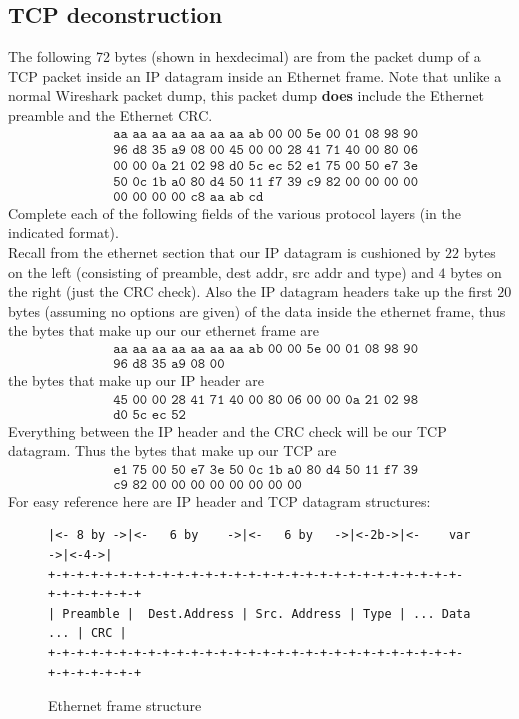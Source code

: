 \documentclass{article}
\begin{document}
\subsection*{TCP deconstruction}
The following 72 bytes (shown in hexdecimal) are from the packet dump of a TCP packet inside an IP datagram inside an Ethernet frame. Note that unlike a normal Wireshark packet dump, this packet dump {\bf does} include the Ethernet preamble and the Ethernet CRC.
\begin{align*}
    & \texttt{aa aa aa aa aa aa aa ab 00 00 5e 00 01 08 98 90} \\
    & \texttt{96 d8 35 a9 08 00 45 00 00 28 41 71 40 00 80 06} \\
    & \texttt{00 00 0a 21 02 98 d0 5c ec 52 e1 75 00 50 e7 3e} \\
    & \texttt{50 0c 1b a0 80 d4 50 11 f7 39 c9 82 00 00 00 00} \\
    & \texttt{00 00 00 00 c8 aa ab cd}
\end{align*}
Complete each of the following fields of the various protocol layers (in the
indicated format).\\[1\baselineskip]
Recall from the ethernet section that our IP datagram is cushioned by $22$ bytes on the left (consisting of preamble, dest addr, src addr and type) and $4$ bytes on the right (just the CRC check). Also the IP datagram headers take up the first $20$ bytes (assuming no options are given) of the data inside the ethernet frame, thus the bytes that make up our our ethernet frame are
\begin{align*}
    & \texttt{aa aa aa aa aa aa aa ab 00 00 5e 00 01 08 98 90} \\
    & \texttt{96 d8 35 a9 08 00}
\end{align*}
the bytes that make up our IP header are
\begin{align*}
    & \texttt{45 00 00 28 41 71 40 00 80 06 00 00 0a 21 02 98} \\
    & \texttt{d0 5c ec 52}
\end{align*}
Everything between the IP header and the CRC check will be our TCP datagram. Thus the bytes that make up our TCP are
\begin{align*}
    & \texttt{e1 75 00 50 e7 3e 50 0c 1b a0 80 d4 50 11 f7 39} \\
    & \texttt{c9 82 00 00 00 00 00 00 00 00}
\end{align*}
For easy reference here are IP header and TCP datagram structures:
\begin{figure}[H]
    \centering
    \caption{Ethernet frame structure}
    \begin{lstlisting}
|<- 8 by ->|<-   6 by    ->|<-   6 by   ->|<-2b->|<-    var   ->|<-4->|
+-+-+-+-+-+-+-+-+-+-+-+-+-+-+-+-+-+-+-+-+-+-+-+-+-+-+-+-+-+-+-+-+-+-+-+
| Preamble |  Dest.Address | Src. Address | Type | ... Data ... | CRC |
+-+-+-+-+-+-+-+-+-+-+-+-+-+-+-+-+-+-+-+-+-+-+-+-+-+-+-+-+-+-+-+-+-+-+-+
    \end{lstlisting}
\end{figure}
\end{document}
